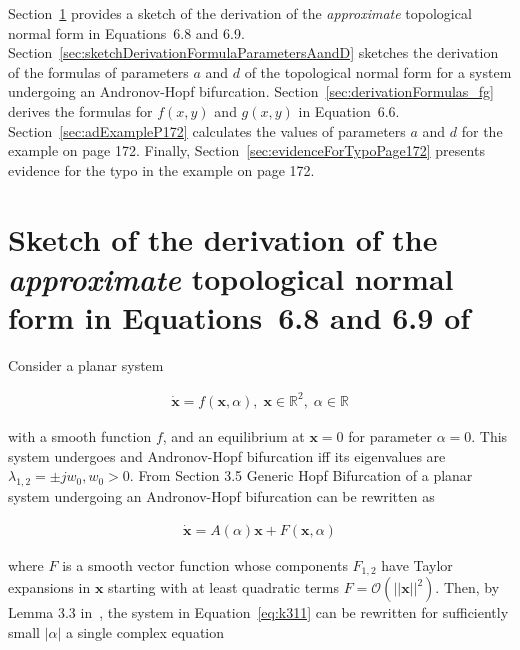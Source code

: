 \documentclass{article}
\theoremstyle{lemma}
\begin{document}
Section~\ref{sec:sketchDerivation6_8and6_9} provides a sketch of the
derivation of the \emph{approximate} topological normal form in Equations~6.8 
and 6.9.
Section~\ref{sec:sketchDerivationFormulaParametersAandD} sketches the
derivation of the formulas of parameters $a$ and $d$ of the topological normal
form for a system undergoing an Andronov-Hopf bifurcation.  
%
Section~\ref{sec:derivationFormulas_fg} derives the formulas for $f(x,y)$ and
$g(x,y)$ in Equation~6.6.
%
Section~\ref{sec:adExampleP172} calculates the values of parameters $a$ and
$d$ for the example on page 172.
%
Finally, Section~\ref{sec:evidenceForTypoPage172} presents evidence for the
typo in the example on page 172.

\section{Sketch of the derivation of the \emph{approximate} topological normal
form in Equations~6.8 and 6.9 of
\citet{izhikevich07}}
\label{sec:sketchDerivation6_8and6_9}

Consider a planar system 

\begin{align}
 \mathbf{\dot{x}}=f(\mathbf{x},\alpha),\; \mathbf{x}\in \mathbb{R}^2,\; \alpha\in \mathbb{R}
 \label{eq:systemUndergoingAHBifurcation}
\end{align}

\noindent with a smooth function $f$, and an equilibrium at $\mathbf{x}=0$ for
parameter $\alpha=0$. This system undergoes and Andronov-Hopf
bifurcation iff its eigenvalues are $\lambda_{1,2}=\pm jw_0, w_0>0$. From
Section 3.5 Generic Hopf Bifurcation of \citet{kuznetsov04} a planar system
undergoing an Andronov-Hopf bifurcation can be
rewritten as

\begin{align}
 \mathbf{\dot{x}}=A(\alpha)\mathbf{x}+F(\mathbf{x},\alpha)
 \label{eq:k311}
\end{align}

\noindent where $F$ is a smooth vector function whose components $F_{1,2}$
have Taylor expansions in $\mathbf{x}$ starting with at least quadratic terms
$F=\mathcal{O}(||\mathbf{x}||^2)$. Then, by Lemma 3.3 in~\citet{kuznetsov04},
the system in Equation~\ref{eq:k311} can be rewritten for sufficiently small
$|\alpha|$ a single complex equation
\end{document}
